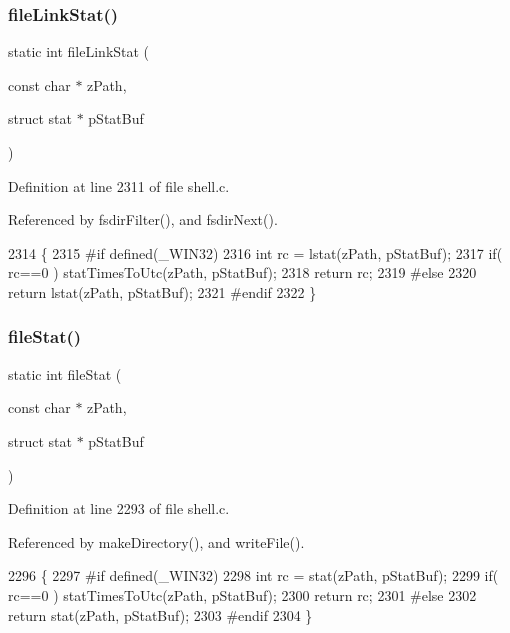 \subsubsection{file\+Link\+Stat()}
{\footnotesize\ttfamily static int file\+Link\+Stat (\begin{DoxyParamCaption}\item[{const char $\ast$}]{z\+Path,  }\item[{struct stat $\ast$}]{p\+Stat\+Buf }\end{DoxyParamCaption})\hspace{0.3cm}{\ttfamily [static]}}



Definition at line 2311 of file shell.\+c.



Referenced by fsdir\+Filter(), and fsdir\+Next().


\begin{DoxyCode}
2314  \{
2315 \textcolor{preprocessor}{#if defined(\_WIN32)}
2316   \textcolor{keywordtype}{int} rc = lstat(zPath, pStatBuf);
2317   \textcolor{keywordflow}{if}( rc==0 ) statTimesToUtc(zPath, pStatBuf);
2318   \textcolor{keywordflow}{return} rc;
2319 \textcolor{preprocessor}{#else}
2320   \textcolor{keywordflow}{return} lstat(zPath, pStatBuf);
2321 \textcolor{preprocessor}{#endif}
2322 \}
\end{DoxyCode}
\mbox{\label{shell_8c_af362c30b9b646f78669291ed4728039b}} 
\subsubsection{file\+Stat()}
{\footnotesize\ttfamily static int file\+Stat (\begin{DoxyParamCaption}\item[{const char $\ast$}]{z\+Path,  }\item[{struct stat $\ast$}]{p\+Stat\+Buf }\end{DoxyParamCaption})\hspace{0.3cm}{\ttfamily [static]}}



Definition at line 2293 of file shell.\+c.



Referenced by make\+Directory(), and write\+File().


\begin{DoxyCode}
2296  \{
2297 \textcolor{preprocessor}{#if defined(\_WIN32)}
2298   \textcolor{keywordtype}{int} rc = stat(zPath, pStatBuf);
2299   \textcolor{keywordflow}{if}( rc==0 ) statTimesToUtc(zPath, pStatBuf);
2300   \textcolor{keywordflow}{return} rc;
2301 \textcolor{preprocessor}{#else}
2302   \textcolor{keywordflow}{return} stat(zPath, pStatBuf);
2303 \textcolor{preprocessor}{#endif}
2304 \}
\end{DoxyCode}
\mbox{\label{shell_8c_a18a3937e4fe6e0e0ceb97f6547058df3}} 
